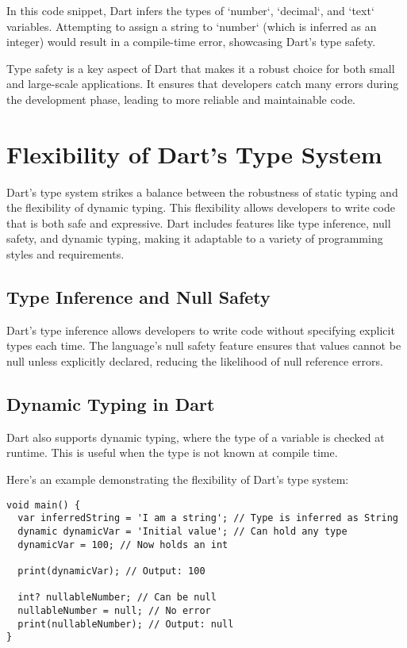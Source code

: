 \documentclass{book}
\begin{document}
In this code snippet, Dart infers the types of `number`, `decimal`, and `text` variables. Attempting to assign a string to `number` (which is inferred as an integer) would result in a compile-time error, showcasing Dart's type safety.

Type safety is a key aspect of Dart that makes it a robust choice for both small and large-scale applications. It ensures that developers catch many errors during the development phase, leading to more reliable and maintainable code.

\chapter{Flexibility of Dart's Type System}

Dart's type system strikes a balance between the robustness of static typing and the flexibility of dynamic typing. This flexibility allows developers to write code that is both safe and expressive. Dart includes features like type inference, null safety, and dynamic typing, making it adaptable to a variety of programming styles and requirements.

\section{Type Inference and Null Safety}
Dart’s type inference allows developers to write code without specifying explicit types each time. The language's null safety feature ensures that values cannot be null unless explicitly declared, reducing the likelihood of null reference errors.

\section{Dynamic Typing in Dart}
Dart also supports dynamic typing, where the type of a variable is checked at runtime. This is useful when the type is not known at compile time.

Here's an example demonstrating the flexibility of Dart's type system:

\begin{lstlisting}[style=dartstyle]
void main() {
  var inferredString = 'I am a string'; // Type is inferred as String
  dynamic dynamicVar = 'Initial value'; // Can hold any type
  dynamicVar = 100; // Now holds an int

  print(dynamicVar); // Output: 100

  int? nullableNumber; // Can be null
  nullableNumber = null; // No error
  print(nullableNumber); // Output: null
}
\end{lstlisting}
\end{document}
